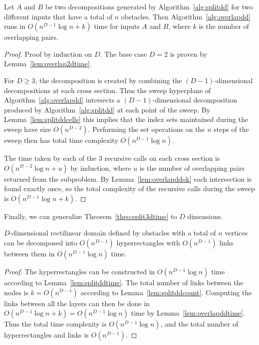 \documentclass[english,gradu]{tktltiki2018}
\begin{document}
\begin{lem}\label{lem:overlapddtime}
Let $A$ and $B$ be two decompositions generated by Algorithm~\ref{alg:splitdd} for two different inputs that have a total of $n$ obstacles.
Then Algorithm~\ref{alg:overlapdd} runs in $O(n^{D-1}\log n + k)$ time for inputs $A$ and $B$, where $k$ is the number of overlapping pairs.
\end{lem}
\begin{proof}
Proof by induction on $D$.
The base case $D=2$ is proven by Lemma~\ref{lem:overlap2dtime}.

For $D\ge 3$, the decomposition is created by combining the $(D-1)$-dimensional decompositions at each cross section.
Thus the sweep hyperplane of Algorithm~\ref{alg:overlapdd} intersects a $(D-1)$-dimensional decomposition produced by Algorithm~\ref{alg:splitdd} at each point of the sweep.
By Lemma~\ref{lem:splitddcells} this implies that the index sets maintained during the sweep have size $O(n^{D-2})$.
Performing the set operations on the $n$ steps of the sweep then has total time complexity $O(n^{D-1}\log n)$.

The time taken by each of the 3 recursive calls on each cross section is $O(n^{D-2}\log n + u)$ by induction, where $u$ is the number of overlapping pairs returned from the subproblem.
By Lemma~\ref{lem:overlapddok} each intersection is found exactly once, so the total complexity of the recursive calls during the sweep is $O(n^{D-1}\log n + k)$.
\end{proof}

Finally, we can generalize Theorem~\ref{theo:split3dtime} to $D$ dimensions.

\begin{theo}\label{theo:splitddtime}$D$-dimensional rectilinear domain defined by obstacles with a total of $n$ vertices can be decomposed into $O(n^{D-1})$ hyperrectangles with $O(n^{D-1})$ links between them in $O(n^{D-1}\log n)$ time.\end{theo}
\begin{proof}
The hyperrectangles can be constructed in $O(n^{D-1}\log n)$ time according to Lemma~\ref{lem:splitddtime}.
The total number of links between the nodes is $k=O(n^{D-1})$ according to Lemma~\ref{lem:splitddcount}.
Computing the links between all the layers can then be done in $O(n^{D-1}\log n+k)=O(n^{D-1}\log n)$ time by Lemma~\ref{lem:overlapddtime}.
Thus the total time complexity is $O(n^{D-1}\log n)$, and the total number of hyperrectangles and links is $O(n^{D-1})$.
\end{proof}
\end{document}

